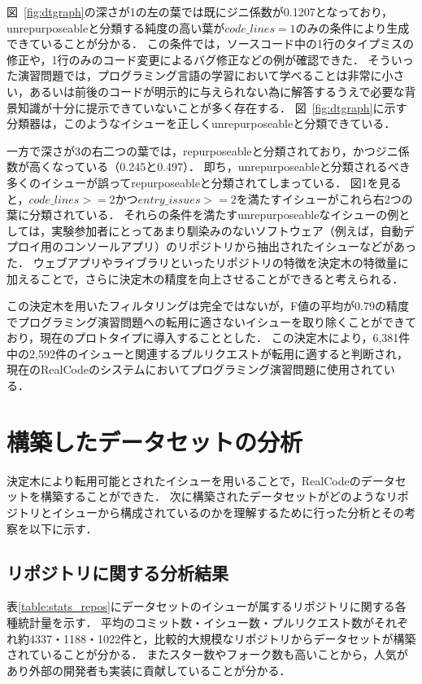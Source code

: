 図~\ref{fig:dtgraph}の深さが1の左の葉では既にジニ係数が0.1207となっており，unrepurposeableと分類する純度の高い葉が$\textit{code\_lines}=1$のみの条件により生成できていることが分かる．
この条件では，ソースコード中の1行のタイプミスの修正や，1行のみのコード変更によるバグ修正などの例が確認できた．
そういった演習問題では，プログラミング言語の学習において学べることは非常に小さい，あるいは前後のコードが明示的に与えられない為に解答するうえで必要な背景知識が十分に提示できていないことが多く存在する．
図~\ref{fig:dtgraph}に示す分類器は，このようなイシューを正しくunrepurposeableと分類できている．

一方で深さが3の右二つの葉では，repurposeableと分類されており，かつジニ係数が高くなっている（0.245と0.497）．
即ち，unrepurposeableと分類されるべき多くのイシューが誤ってrepurposeableと分類されてしまっている．
図1を見ると，$\textit{code\_lines} >= 2$かつ$\textit{entry\_issues} >= 2$を満たすイシューがこれら右2つの葉に分類されている．
それらの条件を満たすunrepurposeableなイシューの例としては，実験参加者にとってあまり馴染みのないソフトウェア（例えば，自動デプロイ用のコンソールアプリ）のリポジトリから抽出されたイシューなどがあった．
ウェブアプリやライブラリといったリポジトリの特徴を決定木の特徴量に加えることで，さらに決定木の精度を向上させることができると考えられる．

この決定木を用いたフィルタリングは完全ではないが，F値の平均が0.79の精度でプログラミング演習問題への転用に適さないイシューを取り除くことができており，現在のプロトタイプに導入することとした．
この決定木により，6,381件中の2,592件のイシューと関連するプルリクエストが転用に適すると判断され，現在のRealCodeのシステムにおいてプログラミング演習問題に使用されている．



\section{構築したデータセットの分析}
決定木により転用可能とされたイシューを用いることで，RealCodeのデータセットを構築することができた．
次に構築されたデータセットがどのようなリポジトリとイシューから構成されているのかを理解するために行った分析とその考察を以下に示す．

\subsection{リポジトリに関する分析結果}

表\ref{table:stats_repos}にデータセットのイシューが属するリポジトリに関する各種統計量を示す．
平均のコミット数・イシュー数・プルリクエスト数がそれぞれ約4337・1188・1022件と，比較的大規模なリポジトリからデータセットが構築されていることが分かる．
またスター数やフォーク数も高いことから，人気があり外部の開発者も実装に貢献していることが分かる．

